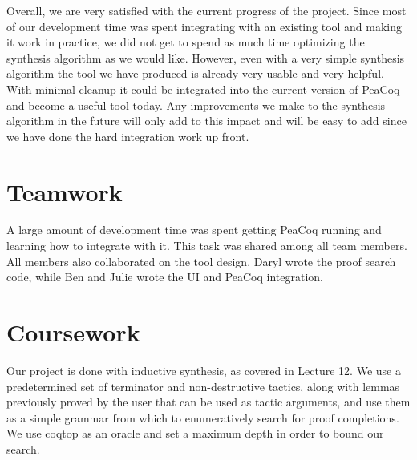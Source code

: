 \documentclass{article}
\begin{document}
Overall, we are very satisfied with the current progress of the project. Since most of our development time was spent integrating with an existing tool and making it work in practice, we did not get to spend as much time optimizing the synthesis algorithm as we would like. However, even with a very simple synthesis algorithm the tool we have produced is already very usable and very helpful. With minimal cleanup it could be integrated into the current version of PeaCoq and become a useful tool today. Any improvements we make to the synthesis algorithm in the future will only add to this impact and will be easy to add since we have done the hard integration work up front.
\section{Teamwork}
A large amount of development time was spent getting PeaCoq running and learning how to integrate with it. This task was shared among all team members. All members also collaborated on the tool design. Daryl wrote the proof search code, while Ben and Julie wrote the UI and PeaCoq integration. 
\section{Coursework}
Our project is done with inductive synthesis, as covered in Lecture 12. We use a predetermined set of terminator and non-destructive tactics, along with lemmas previously proved by the user that can be used as tactic arguments, and use them as a simple grammar from which to enumeratively search for proof completions. We use coqtop as an oracle and set a maximum depth in order to bound our search. 
\printbibliography
\end{document}
